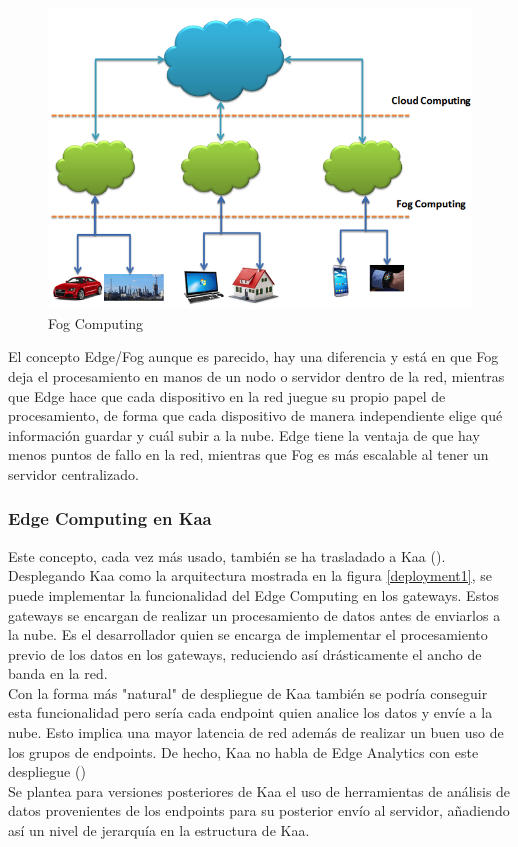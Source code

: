 \documentclass[12pt, twoside]{book}
\newcommand{\MYhref}[3][blue]{\href{#2}{\color{#1}{#3}}}
\begin{document}
\begin{figure}[H]
\centering
\includegraphics[scale=0.5]{images/fog_computing}
\caption{Fog Computing}\label{L509}
\end{figure}

El concepto Edge/Fog aunque es parecido, hay una diferencia y está en que Fog deja el procesamiento en manos de un nodo o servidor dentro de la red, mientras que Edge hace que cada dispositivo en la red juegue su propio papel de procesamiento, de forma que cada dispositivo de manera independiente elige qué información guardar y cuál subir a la nube. Edge tiene la ventaja de que hay menos puntos de fallo en la red, mientras que Fog es más escalable al tener un servidor centralizado.

\subsubsection*{Edge Computing en Kaa}
Este concepto, cada vez más usado, también se ha trasladado a Kaa (\MYhref{https://www.kaaproject.org/edge-analytics-kaa/}{vídeo}).\\
Desplegando Kaa como la arquitectura mostrada en la figura \ref{deployment1}, se puede implementar la funcionalidad del Edge Computing en los gateways. Estos gateways se encargan de realizar un procesamiento de datos antes de enviarlos a la nube. Es el desarrollador quien se encarga de implementar el procesamiento previo de los datos en los gateways, reduciendo así drásticamente el ancho de banda en la red. \\

Con la forma más "natural" de despliegue de Kaa también se podría conseguir esta funcionalidad pero sería cada endpoint quien analice los datos y envíe a la nube. Esto implica una mayor latencia de red además de realizar un buen uso de los grupos de endpoints. De hecho, Kaa no habla de Edge Analytics con este despliegue (\MYhref{https://www.kaaproject.org/platform/\#gate}{enlace})\\
Se plantea para versiones posteriores de Kaa el uso de herramientas de análisis de datos provenientes de los endpoints para su posterior envío al servidor, añadiendo así un nivel de jerarquía en la estructura de Kaa.
\end{document}

